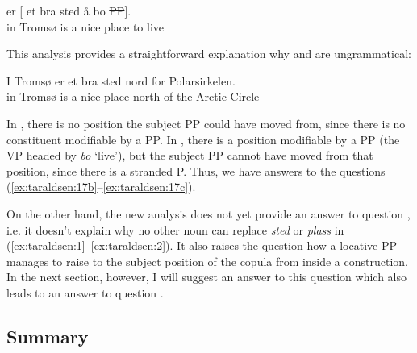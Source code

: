 \documentclass[output=paper]{LSP/langsci}
\begin{document}
\ea%
  \settowidth{}
    \label{ex:taraldsen:32}
    \gll{} er [ et bra sted å bo \st{PP}].\\
                     {}           in Tromsø is  {}  a nice place to live\\
\z

This analysis provides a straightforward explanation why  and  are ungrammatical:

\begin{exe}%
\ea\gll *  I Tromsø er et bra sted nord for Polarsirkelen.\\
        {} in Tromsø is a nice place north of {the Arctic Circle}\\
\z
\end{exe}

\begin{exe}
  \z
\end{exe}

In , there is no position the subject PP could have moved from, since there is no constituent modifiable by a PP. In , there is a position modifiable by a PP (the VP headed by \textit{bo} `live'), but the subject PP cannot have moved from that position, since there is a stranded P. Thus, we have answers to the questions (\ref{ex:taraldsen:17b}--\ref{ex:taraldsen:17c}).

On the other hand, the new analysis does not yet provide an answer to question , i.e. it doesn’t explain why no other noun can replace \textit{sted} or \textit{plass} in (\ref{ex:taraldsen:1}--\ref{ex:taraldsen:2}). It also raises the question how a locative PP manages to raise to the subject position of the copula from inside a  construction. In the next section, however, I will suggest an answer to this question which also leads to an answer to question .

\subsection{Summary}\label{sec:taraldsen:3.3}
\end{document}

